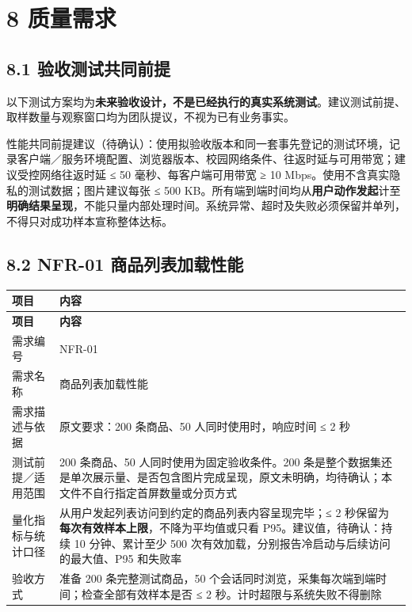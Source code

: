 \documentclass[12pt,a4paper]{ctexart}
\begin{document}
\section*{8 质量需求}

\subsection*{8.1 验收测试共同前提}

以下测试方案均为\textbf{未来验收设计，不是已经执行的真实系统测试}。建议测试前提、取样数量与观察窗口均为团队提议，不视为已有业务事实。


性能共同前提建议（待确认）：使用拟验收版本和同一套事先登记的测试环境，记录客户端／服务环境配置、浏览器版本、校园网络条件、往返时延与可用带宽；建议受控网络往返时延 ≤ 50 毫秒、每客户端可用带宽 ≥ 10 Mbps。使用不含真实隐私的测试数据；图片建议每张 ≤ 500 KB。所有端到端时间均从\textbf{用户动作发起}计至\textbf{明确结果呈现}，不能只量内部处理时间。系统异常、超时及失败必须保留并单列，不得只对成功样本宣称整体达标。



\subsection*{8.2 NFR-01 商品列表加载性能}

{\footnotesize
\begin{longtable}{|p{2.75cm}|p{13.25cm}|}
\hline
\textbf{项目} & \textbf{内容} \\
\hline
\endfirsthead
\hline
\textbf{项目} & \textbf{内容} \\
\hline
\endhead
\hline
\endfoot
需求编号 & NFR-01 \\
\hline
需求名称 & 商品列表加载性能 \\
\hline
需求描述与依据 & 原文要求：200 条商品、50 人同时使用时，响应时间 ≤ 2 秒 \\
\hline
测试前提／适用范围 & 200 条商品、50 人同时使用为固定验收条件。200 条是整个数据集还是单次展示量、是否包含图片完成呈现，原文未明确，均待确认；本文件不自行指定首屏数量或分页方式 \\
\hline
量化指标与统计口径 & 从用户发起列表访问到约定的商品列表内容呈现完毕；≤ 2 秒保留为\textbf{每次有效样本上限}，不降为平均值或只看 P95。建议值，待确认：持续 10 分钟、累计至少 500 次有效加载，分别报告冷启动与后续访问的最大值、P95 和失败率 \\
\hline
验收方式 & 准备 200 条完整测试商品，50 个会话同时浏览，采集每次端到端时间；检查全部有效样本是否 ≤ 2 秒。计时超限与系统失败不得删除 \\
\hline
\end{longtable}
}
\end{document}
